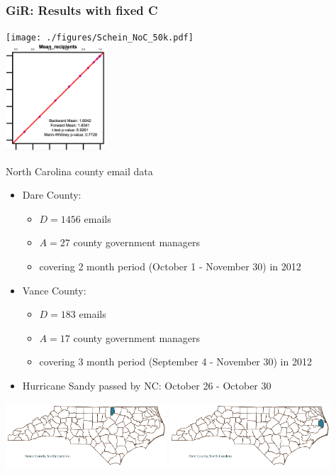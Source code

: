 \documentclass[10pt]{beamer}
\def\bni{\begin{itemize}} \def\ei{\end{itemize}}
\theoremstyle{definition}
\theoremstyle{remark}
\newenvironment{changemargin}[2]{%
  \begin{list}{}{%
    \setlength{\topsep}{0pt}%
    \setlength{\leftmargin}{#1}%
    \setlength{\rightmargin}{#2}%
    \setlength{\listparindent}{\parindent}%
    \setlength{\itemindent}{\parindent}%
    \setlength{\parsep}{\parskip}%
  }%
  \item[]}{\end{list}}
\begin{document}
\begin{frame} \frametitle{GiR: Results with fixed C}
\begin{changemargin}{-1cm}{-.5cm}
 \vspace{-1.5cm}
\texttt{[image: ./figures/Schein\_NoC\_50k.pdf]} \\  \vspace{-6cm} \includegraphics[height=4cm, right]{./figures/ScheinFocusNoC}
\end{changemargin}
\end{frame}


\begin{frame}{North Carolina county email data}
 \bni \item Dare County: 
 \begin{itemize}
 \item $D = 1456$ emails
\item  $A = 27$ county government managers
\item  covering 2 month period (October 1 - November 30) in 2012
 \end{itemize}
 \item Vance County:
  \begin{itemize}
 \item $D = 183$ emails
\item  $A = 17$ county government managers
\item  covering 3 month period (September 4 - November 30) in 2012
 \end{itemize}
 \item Hurricane Sandy passed by NC: October 26 - October 30
 \ei
 
 \centering
  	\includegraphics[width=0.45\textwidth]{figures/Vance.png} 
  	     	\includegraphics[width=0.45\textwidth]{figures/Dare.png}
\end{frame}
\end{document}
